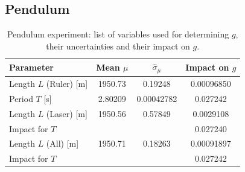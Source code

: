 \documentclass[a4paper,%
               aps,%
               prl,%
               amsfonts,%
               amssymb,%
               amsmath,%
               nobibnotes,%
               twocolumn, %
               twoside,%
               balancelastpage,%
               eqsecnum] %
               {revtex4-1}
\begin{document}
\subsection{Pendulum}

\begin{table}[h]
\caption{Pendulum experiment: list of variables used for determining $g$, their uncertainties and their impact on $g$.}
    \centering
    \begin{tabular}{lccc}
    Parameter & Mean $\mu$ &  $\hat{\sigma}_{\mu}$ &  Impact on $g$ \\\toprule
    Length $L$ (Ruler) [\si{\m}] & \num[round-precision=6,round-mode=figures]{1950.73} & \num[round-precision=5,round-mode=figures]{0.19248} & \num[round-precision=5,round-mode=figures,
     scientific-notation=true]{0.00096850} \\
    Period $T$ [\si{\s}]  & \num[round-precision=6,round-mode=figures]{2.80209} & \num[round-precision=5,round-mode=figures,
     scientific-notation=true]{0.00042782} & \num[round-precision=5,round-mode=figures]{0.027242} \\
    Length $L$ (Laser) [\si{\m}] & \num[round-precision=6,round-mode=figures]{1950.56} & \num[round-precision=5,round-mode=figures]{0.57849} & \num[round-precision=5,round-mode=figures,
     scientific-notation=true]{0.0029108} \\
    Impact for $T$  & \num[round-precision=6,round-mode=figures]{} & \num[round-precision=5,round-mode=figures,
     scientific-notation=true]{} & \num[round-precision=5,round-mode=figures]{0.027240} \\
    Length $L$ (All) [\si{\m}] & \num[round-precision=6,round-mode=figures]{1950.71} & \num[round-precision=5,round-mode=figures]{0.18263} & \num[round-precision=5,round-mode=figures,
     scientific-notation=true]{0.00091897} \\
    Impact for $T$  & \num[round-precision=6,round-mode=figures,
     scientific-notation=true]{} & \num[round-precision=5,round-mode=figures,
     scientific-notation=true]{} & \num[round-precision=5,round-mode=figures]{0.027242} \\
    \end{tabular}
\end{table}
\end{document}
